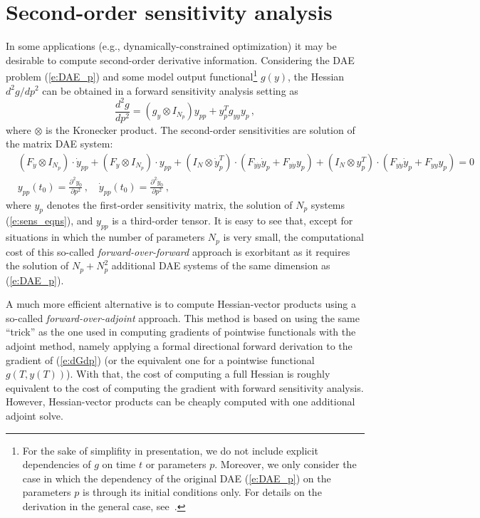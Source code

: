 \section{Second-order sensitivity analysis}\label{ss:hess_sensi}
In some applications (e.g., dynamically-constrained optimization) it may
be desirable to compute second-order derivative information. Considering 
the DAE problem (\ref{e:DAE_p}) and some model output
functional\footnote{For the sake of simplifity in presentation, we do not 
include explicit dependencies of $g$ on time $t$ or parameters $p$.
Moreover, we only consider the case in which the dependency of the 
original DAE (\ref{e:DAE_p}) on the parameters $p$ is through its initial conditions only.
For details on the derivation in the general case, see~\cite{OzBa:05}.}
$g(y)$, the Hessian $d^2g/dp^2$ can be obtained in a forward sensitivity
analysis setting as
\begin{equation*}
\frac{d^2 g}{d p^2} = \left(g_y \otimes I_{N_p} \right ) y_{pp} + y_p^T g_{yy} y_p \, ,
\end{equation*}
where $\otimes$ is the Kronecker product. The second-order sensitivities are
solution of the matrix DAE system:
\begin{equation*}
  \begin{split}
  & \left( F_{\dot y} \otimes I_{N_p} \right) \cdot \dot y_{pp}  +
  \left( F_y        \otimes I_{N_p} \right) \cdot y_{pp}       +
  \left( I_N \otimes {\dot y}_p^T \right) \cdot \left( F_{\dot y \dot y} \dot y_p + F_{y \dot y} y_p \right) +
  \left( I_N \otimes y_p^T        \right) \cdot \left( F_{y \dot y}      \dot y_p + F_{y y}      y_p \right) = 0 \\
  & y_{pp}(t_0) = \frac{\partial^2 y_0}{\partial p^2} \, , \quad 
  \dot y_{pp}(t_0) = \frac{\partial^2 \dot y_0}{\partial p^2} \, ,
  \end{split}
\end{equation*}
where $y_p$ denotes the first-order sensitivity matrix, the solution of $N_p$ 
systems (\ref{e:sens_eqns}), and $y_{pp}$ is a third-order tensor.
It is easy to see that, except for situations in which the number of parameters
$N_p$ is very small, the computational cost of this so-called {\em forward-over-forward} 
approach is exorbitant as it requires the solution of $N_p + N_p^2$ additional
DAE systems of the same dimension as (\ref{e:DAE_p}).

A much more efficient alternative is to compute Hessian-vector products using
a so-called {\em forward-over-adjoint} approach. This method is based on using
the same ``trick'' as the one used in computing gradients of pointwise
functionals with the adjoint method, namely applying a formal directional forward 
derivation to the gradient of (\ref{e:dGdp}) (or the equivalent one for a pointwise 
functional $g(T, y(T))$). With that, the cost of computing a full Hessian is roughly 
equivalent to the cost of computing the  gradient with forward sensitivity analysis.
However, Hessian-vector products can be cheaply computed with one additional adjoint solve.

